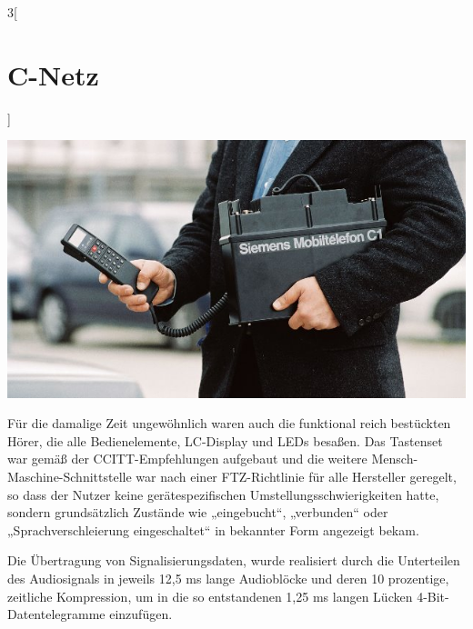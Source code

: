 \begin{multicols}{3}[\section{C-Netz}]
\begin{Figure}
\includegraphics[width=\linewidth]{Kapitel/C-Netz/Grafiken/MobiltelefonC1.jpg}
\label{fig:c-netz.mobiltelefonEins}
\end{Figure}
Für die damalige Zeit ungewöhnlich waren auch die funktional reich bestückten Hörer, die alle Bedienelemente, LC-Display und LEDs besaßen. 
Das Tastenset war gemäß der CCITT-Empfehlungen aufgebaut und die weitere Mensch-Maschine-Schnittstelle war nach einer FTZ-Richtlinie für alle Hersteller geregelt, so dass der Nutzer keine gerätespezifischen Umstellungsschwierigkeiten hatte, sondern grundsätzlich Zustände wie „eingebucht“, „verbunden“ oder „Sprachverschleierung eingeschaltet“ in bekannter Form angezeigt bekam.

Die Übertragung von Signalisierungsdaten, wurde realisiert durch die Unterteilen des Audiosignals in jeweils 12,5 ms lange Audioblöcke und deren 10 prozentige, zeitliche Kompression, um in die so entstandenen 1,25 ms langen Lücken 4-Bit-Datentelegramme einzufügen.


\end{multicols}
